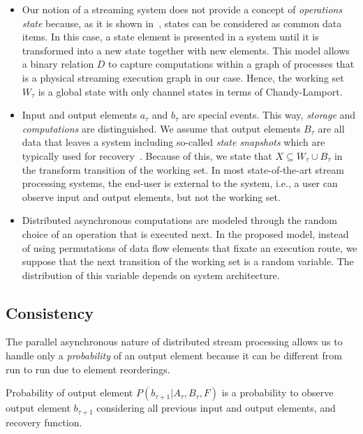 \begin{itemize}
    \item Our notion of a streaming system does not provide a concept of {\em operations state} because, as it is shown in~\cite{we2018adbis}, states can be considered as common data items. In this case, a state element is presented in a system until it is transformed into a new state together with new elements. This model allows a binary relation $D$ to capture computations within a graph of processes that is a physical streaming execution graph in our case. Hence, the working set $W_\tau$ is a global state with only channel states in terms of Chandy-Lamport.
    \item Input and output elements $a_\tau$ and $b_\tau$ are special events. This way, {\em storage} and {\em computations} are distinguished. We assume that output elements $B_\tau$ are all data that leaves a system including so-called {\em state snapshots} which are typically used for recovery~\cite{Carbone:2017:SMA:3137765.3137777}. Because of this, we state that $X \subseteq W_\tau \cup B_\tau$ in the transform transition of the working set. In most state-of-the-art stream processing systems, the end-user is external to the system, i.e., a user can observe input and output elements, but not the working set.
    \item Distributed asynchronous computations are modeled through the random choice of an operation that is executed next. In the proposed model, instead of using permutations of data flow elements that fixate an execution route, we suppose that the next transition of the working set is a random variable. The distribution of this variable depends on system architecture. 
\end{itemize}

\subsection{Consistency}

The parallel asynchronous nature of distributed stream processing allows us to handle only a {\em probability} of an output element because it can be different from run to run due to element reorderings.

\begin{definition}{Probability of output element}
$P(b_{\tau+1}|A_{\tau}, B_\tau, F)$ is a probability to observe output element $b_{\tau+1}$ considering all previous input and output elements, and recovery function.
\end{definition}


